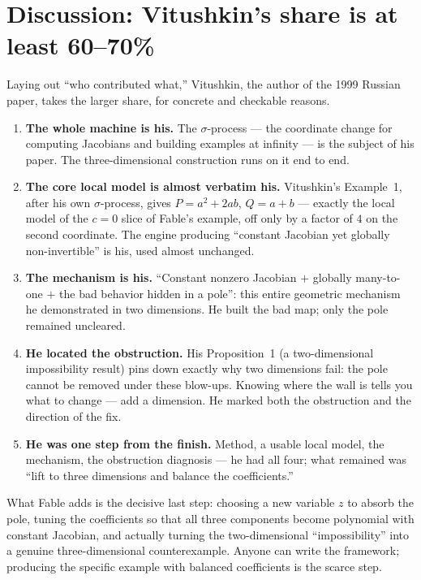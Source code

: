 \documentclass[11pt]{article}
\theoremstyle{plain}
\theoremstyle{definition}
\begin{document}
\section*{Discussion: Vitushkin's share is at least 60--70\%}
Laying out ``who contributed what,'' Vitushkin, the author of the 1999
Russian paper, takes the larger share, for concrete and checkable reasons.
\begin{enumerate}[label=\textbf{\arabic*.},nosep,leftmargin=*]
  \item \textbf{The whole machine is his.} The $\sigma$-process --- the
        coordinate change for computing Jacobians and building examples at
        infinity --- is the subject of his paper. The three-dimensional
        construction runs on it end to end.
  \item \textbf{The core local model is almost verbatim his.} Vitushkin's
        Example~1, after his own $\sigma$-process, gives $P=a^2+2ab$,
        $Q=a+b$ --- exactly the local model of the $c=0$ slice of Fable's
        example, off only by a factor of $4$ on the second coordinate. The
        engine producing ``constant Jacobian yet globally non-invertible'' is
        his, used almost unchanged.
  \item \textbf{The mechanism is his.} ``Constant nonzero Jacobian $+$
        globally many-to-one $+$ the bad behavior hidden in a pole'': this
        entire geometric mechanism he demonstrated in two dimensions. He built
        the bad map; only the pole remained uncleared.
  \item \textbf{He located the obstruction.} His Proposition~1 (a
        two-dimensional impossibility result) pins down exactly why two
        dimensions fail: the pole cannot be removed under these blow-ups.
        Knowing where the wall is tells you what to change --- add a
        dimension. He marked both the obstruction and the direction of the fix.
  \item \textbf{He was one step from the finish.} Method, a usable local
        model, the mechanism, the obstruction diagnosis --- he had all four;
        what remained was ``lift to three dimensions and balance the
        coefficients.''
\end{enumerate}

What Fable adds is the decisive last step: choosing a new variable $z$ to
absorb the pole, tuning the coefficients so that all three components become
polynomial with constant Jacobian, and actually turning the two-dimensional
``impossibility'' into a genuine three-dimensional counterexample. Anyone can
write the framework; producing the specific example with balanced
coefficients is the scarce step.
\end{document}
